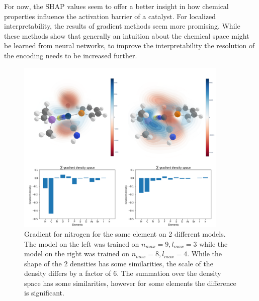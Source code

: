 For now, the SHAP values seem to offer a better insight in how chemical properties influence the activation barrier of a catalyst.
For localized interpretability, the results of gradient methods seem more promising.
While these methods show that generally an intuition about the chemical space might be learned from neural networks,
to improve the interpretability the resolution of the encoding needs to be increased further.
\begin{figure}[hb]
  \centering
  \includegraphics[width=0.9\textwidth]{figures/evaluation/Gradient-model-comp.png}
  \caption[Comparison of gradients between different models]{
      Gradient for nitrogen for the same element on 2 different models.
      The model on the left was trained on $n_{max} = 9, l_{max}=3$ while the model on the right was trained on 
      $n_{max}=8, l_{max}=4$. 
      While the shape of the 2 densities has some similarities, the scale of the density differs by a factor of 6.
      The summation over the density space has some similarities, however for some elements the difference is significant.
   }
  \label{fig:snap-gradient-model}
\end{figure}